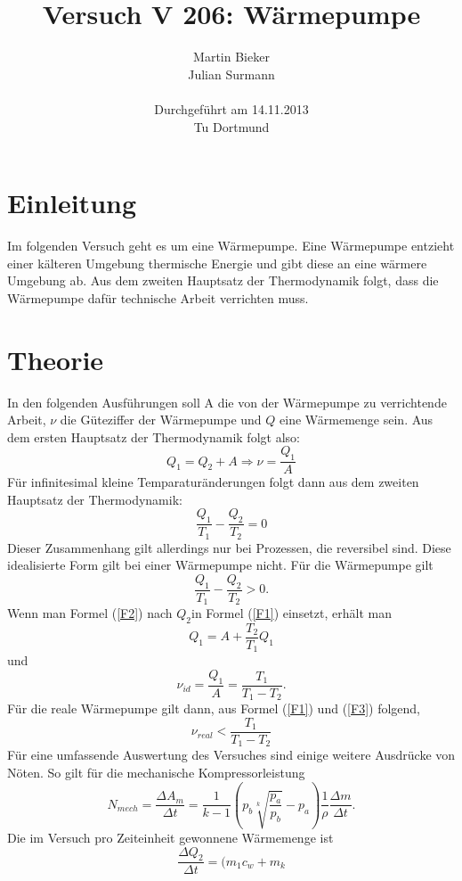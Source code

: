 \documentclass[11pt]{article}
\title{\textbf{Versuch V 206: Wärmepumpe}}
\author{Martin Bieker\\
		Julian Surmann\\
		\\
		Durchgef\"{u}hrt am 14.11.2013\\
		Tu Dortmund}
\date{}
\begin{document}
\renewcommand\tablename{Tabelle}
\renewcommand\figurename{Abbildung}
\maketitle
\thispagestyle{empty}
\newpage
\clearpage
\setcounter{page}{1}


\section{Einleitung}
Im folgenden Versuch geht es um eine Wärmepumpe. Eine Wärmepumpe entzieht einer kälteren Umgebung thermische Energie und gibt diese an eine wärmere Umgebung ab. Aus dem zweiten Hauptsatz der Thermodynamik folgt, dass die Wärmepumpe dafür technische Arbeit verrichten muss.
\section{Theorie}
In den folgenden Ausführungen soll A die von der Wärmepumpe zu verrichtende Arbeit, $\nu$ die Güteziffer der Wärmepumpe und $Q$ eine Wärmemenge sein. Aus dem ersten Hauptsatz der Thermodynamik folgt also:
\begin{equation}
\label{F1}
Q_1 = Q_2 + A \Rightarrow \nu = \frac{Q_1}{A}
\end{equation}
Für infinitesimal kleine Temparaturänderungen folgt dann aus dem zweiten Hauptsatz der Thermodynamik:
\begin{equation}
\label{F2}
\frac{Q_1}{T_1} - \frac{Q_2}{T_2} = 0
\end{equation}
Dieser Zusammenhang gilt allerdings nur bei Prozessen, die reversibel sind. Diese idealisierte Form gilt bei einer Wärmepumpe nicht. Für die Wärmepumpe gilt
\begin{equation}
\label{F3}
\frac{Q_1}{T_1} - \frac{Q_2}{T_2} > 0.
\end{equation}
Wenn man Formel (\ref{F2}) nach $Q_2$in Formel (\ref{F1}) einsetzt, erhält man
\begin{equation}
\label{F4}
Q_1 = A + \frac{T_2}{T_1} Q_1
\end{equation}
und
\begin{equation}
\label{F5}
\nu_{id} = \frac{Q_1}{A} = \frac{T_1}{T_1-T_2}.
\end{equation}
Für die reale Wärmepumpe gilt dann, aus Formel (\ref{F1}) und (\ref{F3}) folgend,
\begin{equation}
\label{F6}
\nu_{real} < \frac{T_1}{T_1-T_2}
\end{equation}
Für eine umfassende Auswertung des Versuches sind einige weitere Ausdrücke von Nöten.
So gilt für die mechanische Kompressorleistung
\begin{equation}
\label{F7}
N_{mech} = \frac{\Delta A_m}{\Delta t} = \frac{1}{k-1} \left(p_b \sqrt[k]{\frac{p_a}{p_b}}-p_a \right) \frac{1}{\rho} \frac{\Delta m}{\Delta t}.
\end{equation}
Die im Versuch pro Zeiteinheit gewonnene Wärmemenge ist
\begin{equation}
\label{F8}
\frac{\Delta Q_2}{\Delta t} = (m_1c_w + m_k
\end{equation}
\end{document}
